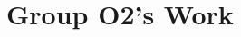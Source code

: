 \documentclass[11pt, handout]{beamer}
\theoremstyle{example}
\begin{document}
\section{Group O2's Work}
\end{document}
